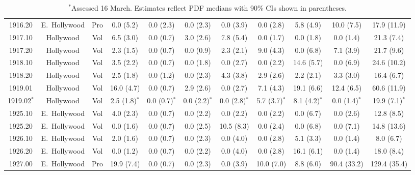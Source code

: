 \documentclass[11pt,twocolumn]{article}
\begin{document}
\begin{table}[t]
{\begin{tabular}{ccccccccccc}
1916.20 & E.~Hollywood & Pro &  0.0 (5.2) &  0.0 (2.3) &  0.0 (2.3) &  0.0 (3.9) &  0.0 (2.8) &  5.8 (4.9) & 10.0 (7.5) &  17.9 (11.9) \\
1917.10 & Hollywood & Vol &  6.5 (3.0) &  0.0 (0.7) &  3.0 (2.6) &  7.8 (5.4) &  0.0 (1.7) &  0.0 (1.8) &  0.0 (1.4) &  21.3 (7.4) \\
1917.20 & Hollywood & Vol &  2.3 (1.5) &  0.0 (0.7) &  0.0 (0.9) &  2.3 (2.1) &  9.0 (4.3) &  0.0 (6.8) &  7.1 (3.9) &  21.7 (9.6) \\
1918.10 & Hollywood & Vol &  3.5 (2.2) &  0.0 (0.7) &  0.0 (1.8) &  0.0 (2.7) &  0.0 (2.2) & 14.6 (5.7) &  0.0 (6.9) &  24.6 (10.2) \\
1918.20 & Hollywood & Vol &  2.5 (1.8) &  0.0 (1.2) &  0.0 (2.3) &  4.3 (3.8) &  2.9 (2.6) &  2.2 (2.1) &  3.3 (3.0) &  16.4 (6.7) \\
1919.01 & Hollywood & Vol & 16.0 (4.7) &  0.0 (0.7) &  2.9 (2.6) &  0.0 (2.7) &  7.1 (4.3) & 19.1 (6.6) & 12.4 (6.5) &  60.6 (11.9) \\
1919.02$^{\ast}$ & Hollywood & Vol & 2.5 (1.8)$^{\ast}$ &  0.0 (0.7)$^{\ast}$ &  0.0 (2.2)$^{\ast}$ &  0.0 (2.8)$^{\ast}$ &  5.7 (3.7)$^{\ast}$ &  8.1 (4.2)$^{\ast}$ &  0.0 (1.4)$^{\ast}$ &  19.9 (7.1)$^{\ast}$  \\
1925.10 & E.~Hollywood & Vol &  4.0 (2.3) &  0.0 (0.7) &  0.0 (2.2) &  0.0 (2.2) &  0.0 (2.2) &  0.0 (6.7) &  0.0 (2.6) &  12.8 (8.5) \\
1925.20 & E.~Hollywood & Vol &  0.0 (1.6) &  0.0 (0.7) &  0.0 (2.5) & 10.5 (8.3) &  0.0 (2.4) &  0.0 (6.8) &  0.0 (7.1) &  14.8 (13.6) \\
1926.10 & E.~Hollywood & Vol &  2.0 (1.6) &  0.0 (0.7) &  0.0 (2.3) &  0.0 (4.0) &  0.0 (2.8) &  5.1 (3.3) &  0.0 (1.4) &   8.0 (6.7) \\
1926.20 & E.~Hollywood & Vol &  0.0 (1.2) &  0.0 (0.7) &  0.0 (2.2) &  0.0 (4.0) &  0.0 (2.8) & 16.1 (6.1) &  0.0 (1.4) &  18.0 (8.4) \\
1927.00 & E.~Hollywood & Pro & 19.9 (7.4) &  0.0 (0.7) &  0.0 (2.3) &  0.0 (3.9) & 10.0 (7.0) &  8.8 (6.0) & 90.4 (33.2) & 129.4 (35.4) \\
\bottomrule
\end{tabular}
}
\caption*{$^{\ast}$Assessed 16 March. Estimates reflect PDF medians with 90\% CIs shown in parentheses.}
\label{tbl:allPop}
\end{table}
\end{document}
